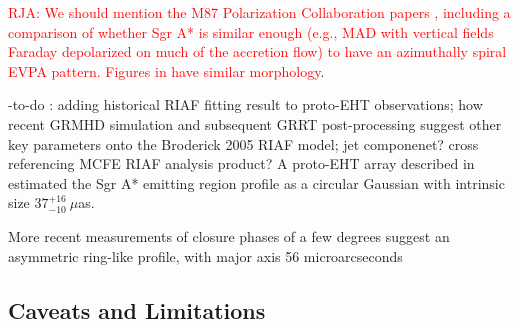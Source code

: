 
\textcolor{red}{RJA: We should mention the M87 Polarization Collaboration papers \cite{EHTCPaperVII}, including a comparison of whether Sgr A* is similar enough (e.g., MAD with vertical fields Faraday depolarized on much of the accretion flow) to have an azimuthally spiral EVPA pattern. Figures in  \citep{Emami2021} have similar morphology}.

\hyp{to-do :  adding historical RIAF fitting result to proto-EHT observations; how recent  GRMHD simulation and subsequent GRRT post-processing suggest other key parameters onto the Broderick 2005 RIAF model; jet componenet? cross referencing MCFE RIAF analysis product?} A proto-EHT array described in \cite{Doeleman2008} estimated the Sgr A* emitting region profile as a circular Gaussian with intrinsic size $37^{+16}_{-10}\ \mu$as.


More recent measurements of closure phases of a few degrees \cite{Fish2016} suggest an asymmetric ring-like profile, with major axis 56 microarcseconds

\subsection{Caveats and Limitations}

